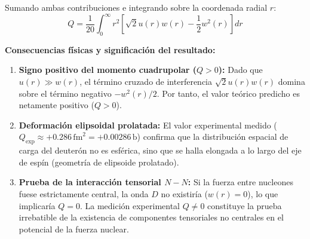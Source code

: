 \begin{problema}
Sumando ambas contribuciones e integrando sobre la coordenada radial $r$:
\begin{equation}
Q = \frac{1}{20} \int_0^\infty r^2 \left[ \sqrt{2} u(r) w(r) - \frac{1}{2} w^2(r) \right] dr
\end{equation}

\textbf{Consecuencias físicas y significación del resultado:}
\begin{enumerate}[label=\arabic*)]
    \item \textbf{Signo positivo del momento cuadrupolar ($Q > 0$):} Dado que $u(r) \gg w(r)$, el término cruzado de interferencia $\sqrt{2} u(r) w(r)$ domina sobre el término negativo $-w^2(r)/2$. Por tanto, el valor teórico predicho es netamente positivo ($Q > 0$).
    \item \textbf{Deformación elipsoidal prolatada:} El valor experimental medido ($Q_{\text{exp}} \approx +0.286 \, \text{fm}^2 = +0.00286 \, \text{b}$) confirma que la distribución espacial de carga del deuterón no es esférica, sino que se halla elongada a lo largo del eje de espín (geometría de elipsoide prolatado).
    \item \textbf{Prueba de la interacción tensorial $N-N$:} Si la fuerza entre nucleones fuese estrictamente central, la onda $D$ no existiría ($w(r) = 0$), lo que implicaría $Q = 0$. La medición experimental $Q \neq 0$ constituye la prueba irrebatible de la existencia de componentes tensoriales no centrales en el potencial de la fuerza nuclear.
\end{enumerate}

\begin{center}
\end{center}

\end{problema}



